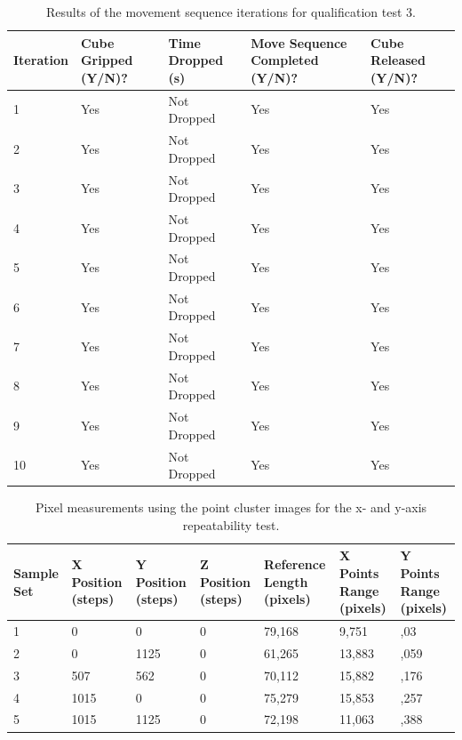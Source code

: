 \begin{table}[H]
	\renewcommand{\arraystretch}{1.3}
	\centering
	\begin{tabular}{|>{\raggedright}m{1.6cm}|>{\raggedright}m{2.6cm}|>{\raggedright}m{3.2cm}|>{\raggedright}m{3.3cm}|>{\raggedright\arraybackslash}m{2.6cm}|}
		\hline
		\textbf{Iteration} & \textbf{Cube Gripped (Y/N)?} & \textbf{Time Dropped (s)} & \textbf{Move Sequence Completed (Y/N)?} & \textbf{Cube Released (Y/N)?} \\
		\hline
		1 & Yes & Not Dropped & Yes & Yes \\ \hline
		2 & Yes & Not Dropped & Yes & Yes \\ \hline
		3 & Yes & Not Dropped & Yes & Yes \\ \hline
		4 & Yes & Not Dropped & Yes & Yes \\ \hline
		5 & Yes & Not Dropped & Yes & Yes \\ \hline
		6 & Yes & Not Dropped & Yes & Yes \\ \hline
		7 & Yes & Not Dropped & Yes & Yes \\ \hline
		8 & Yes & Not Dropped & Yes & Yes \\ \hline
		9 & Yes & Not Dropped & Yes & Yes \\ \hline
		10 & Yes & Not Dropped & Yes & Yes \\ \hline
	\end{tabular}
	\caption{\label{tab:techdoc-qtp3}Results of the movement sequence iterations for qualification test 3.}
\end{table}


\begin{table}[H]
	\renewcommand{\arraystretch}{1.3}
	\centering
	\begin{tabular}{|>{\raggedright}m{1.5cm}|>{\raggedright}m{1.9cm}|>{\raggedright}m{1.9cm}|>{\raggedright}m{1.9cm}|>{\raggedright}m{1.8cm}|>{\raggedright}m{1.6cm}|>{\raggedright\arraybackslash}m{1.6cm}|}
		\hline
		\textbf{Sample Set} & \textbf{X Position (steps)} & \textbf{Y Position (steps)} & \textbf{Z Position (steps)} & \textbf{Reference Length (pixels)} & \textbf{X Points Range (pixels)} & \textbf{Y Points Range (pixels)} \\
		\hline
		1 & 0    & 0    & 0 & 79,168 & 9,751  & 8,03   \\
		\hline
		2 & 0    & 1125 & 0 & 61,265 & 13,883 & 11,059 \\
		\hline
		3 & 507  & 562  & 0 & 70,112 & 15,882 & 12,176 \\
		\hline
		4 & 1015 & 0    & 0 & 75,279 & 15,853 & 12,257 \\
		\hline
		5 & 1015 & 1125 & 0 & 72,198 & 11,063 & 8,388 \\
		\hline
	\end{tabular}
	\caption{\label{tab:techdoc-qtp4-xy1}Pixel measurements using the point cluster images for the x- and y-axis repeatability test.}
\end{table}


